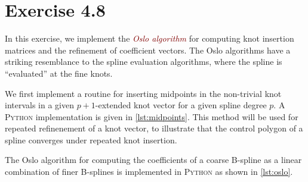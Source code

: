 \documentclass{article}
\let\oldemph\emph
\renewcommand{\emph}[1]{\textcolor{Maroon}{\oldemph{#1}}}
\begin{document}
    \section*{Exercise 4.8}
    In this exercise, we implement the \emph{Oslo algorithm} for computing knot
    insertion matrices and the refinement of coefficient vectors. The Oslo
    algorithms have a striking resemblance to the spline evaluation algorithms,
    where the spline is ``evaluated'' at the fine knots.

    We first implement a routine for inserting midpoints in the non-trivial
    knot intervals in a given $p+1$-extended knot vector for a given spline
    degree $p$. A \textsc{Python} implementation is given in
    \cref{lst:midpoints}. This method will be used for repeated refinenement of
    a knot vector, to illustrate that the control polygon of a spline converges
    under repeated knot insertion.
    
    The Oslo algorithm for computing the coefficients of a coarse B-spline as a
    linear combination of finer B-splines is implemented in \textsc{Python} as
    shown in \cref{lst:oslo}.
\end{document}
